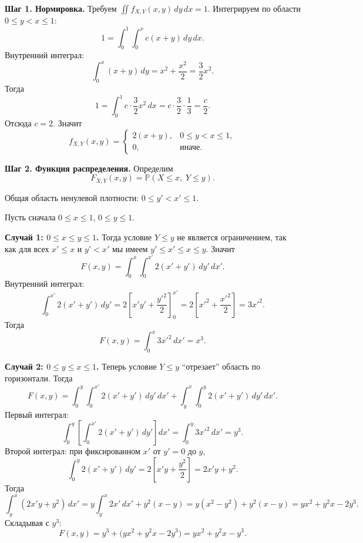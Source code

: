 \documentclass[12pt]{article}
\newcommand{\Pbb}{\mathbb{P}}
\begin{document}
    \textbf{Шаг 1. Нормировка.}
    Требуем $\iint f_{X,Y}(x,y)\,dy\,dx = 1$. Интегрируем по области $0\le y < x \le 1$:
    \[
        1 = \int_0^1 \int_0^x c(x+y)\,dy\,dx.
    \]
    Внутренний интеграл:
    \[
        \int_0^x (x+y)\,dy = x^2 + \frac{x^2}{2} = \frac{3}{2}x^2.
    \]
    Тогда
    \[
        1 = \int_0^1 c \cdot \frac{3}{2}x^2\,dx
        = c\cdot \frac{3}{2}\cdot \frac{1}{3}
        = \frac{c}{2}.
    \]
    Отсюда $c=2$. Значит
    \[
        f_{X,Y}(x,y) =
        \begin{cases}
            2(x+y), & 0 \le y < x \le 1,\\
            0, & \text{иначе.}
        \end{cases}
    \]

    \medskip

    \textbf{Шаг 2. Функция распределения.}
    Определим
    \[
        F_{X,Y}(x,y) = \Pbb(X \le x,\; Y \le y).
    \]

    Общая область ненулевой плотности: $0 \le y' < x' \le 1$.

    Пусть сначала $0 \le x \le 1$, $0 \le y \le 1$.

    \textbf{Случай 1: $0 \le x \le y \le 1$.}
    Тогда условие $Y \le y$ не является ограничением, так как для всех $x' \le x$ и $y' < x'$ мы имеем $y' \le x' \le x \le y$. Значит
    \[
        F(x,y)
        = \int_{0}^{x} \int_{0}^{x'} 2(x'+y')\,dy'\,dx'.
    \]
    Внутренний интеграл:
    \[
        \int_0^{x'} 2(x'+y')\,dy' = 2\left[x'y' + \frac{y'^2}{2}\right]_{0}^{x'}
        = 2\left[x'^2 + \frac{x'^2}{2}\right]
        = 3x'^2.
    \]
    Тогда
    \[
        F(x,y)
        = \int_0^{x} 3x'^2\,dx'
        = x^3.
    \]

    \textbf{Случай 2: $0 \le y \le x \le 1$.}
    Теперь условие $Y \le y$ ``отрезает'' область по горизонтали. Тогда
    \[
        F(x,y)
        = \int_{0}^{y} \int_{0}^{x'} 2(x'+y')\,dy'\,dx'
        + \int_{y}^{x} \int_{0}^{y} 2(x'+y')\,dy'\,dx'.
    \]
    Первый интеграл:
    \[
        \int_0^{y} \left[ \int_0^{x'} 2(x'+y')\,dy' \right] dx'
        = \int_0^{y} 3x'^2\,dx'
        = y^3.
    \]
    Второй интеграл: при фиксированном $x'$ от $y'=0$ до $y$,
    \[
        \int_0^{y} 2(x'+y')\,dy'
        = 2\left[x'y + \frac{y^2}{2}\right]
        = 2x'y + y^2.
    \]
    Тогда
    \[
        \int_y^{x} (2x'y + y^2)\,dx'
        = y \int_y^x 2x'\,dx' + y^2(x-y)
        = y(x^2 - y^2) + y^2(x-y)
        = yx^2 + y^2 x - 2y^3.
    \]
    Складывая с $y^3$:
    \[
        F(x,y)
        = y^3 + \bigl(yx^2 + y^2 x - 2y^3\bigr)
        = yx^2 + y^2 x - y^3.
    \]
\end{document}
